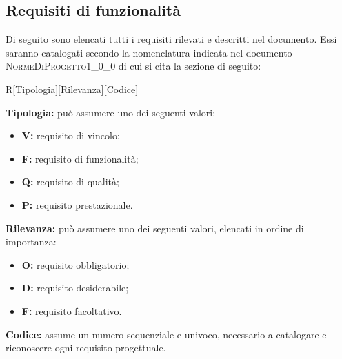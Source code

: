 \subsection{Requisiti di funzionalità}

Di seguito sono elencati tutti i requisiti rilevati e descritti nel documento. Essi saranno catalogati secondo la nomenclatura indicata nel documento \textsc{NormeDiProgetto1\_0\_0} di cui si cita la sezione di seguito:

\begin{center}
	R[Tipologia][Rilevanza][Codice]
\end{center}
\textbf{Tipologia:} può assumere uno dei seguenti valori:
\begin{itemize}
	\item \textbf{V:} requisito di vincolo;
	\item \textbf{F:} requisito di funzionalità;
	\item \textbf{Q:} requisito di qualità;
	\item \textbf{P:} requisito prestazionale.
\end{itemize}
\textbf{Rilevanza:} può assumere uno dei seguenti valori, elencati in ordine di importanza:
\begin{itemize}
	\item \textbf{O:} requisito obbligatorio;
	\item \textbf{D:} requisito desiderabile;
	\item \textbf{F:} requisito facoltativo.
\end{itemize}
\textbf{Codice:} assume un numero sequenziale e univoco, necessario a catalogare e riconoscere ogni requisito progettuale.

